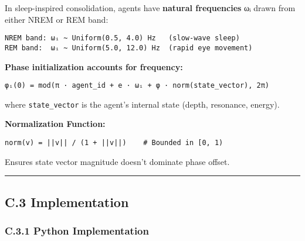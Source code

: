 \documentclass[
]{article}
\begin{document}
In sleep-inspired consolidation, agents have \textbf{natural
frequencies} ωᵢ drawn from either NREM or REM band:

\begin{verbatim}
NREM band: ωᵢ ~ Uniform(0.5, 4.0) Hz   (slow-wave sleep)
REM band:  ωᵢ ~ Uniform(5.0, 12.0) Hz  (rapid eye movement)
\end{verbatim}

\textbf{Phase initialization accounts for frequency:}

\begin{verbatim}
φᵢ(0) = mod(π · agent_id + e · ωᵢ + φ · norm(state_vector), 2π)
\end{verbatim}

where \texttt{state\_vector} is the agent's internal state (depth,
resonance, energy).

\textbf{Normalization Function:}

\begin{verbatim}
norm(v) = ||v|| / (1 + ||v||)    # Bounded in [0, 1)
\end{verbatim}

Ensures state vector magnitude doesn't dominate phase offset.

\begin{center}\rule{0.5\linewidth}{0.5pt}\end{center}

\subsection{C.3 Implementation}\label{c.3-implementation}

\subsubsection{C.3.1 Python
Implementation}\label{c.3.1-python-implementation}
\end{document}
